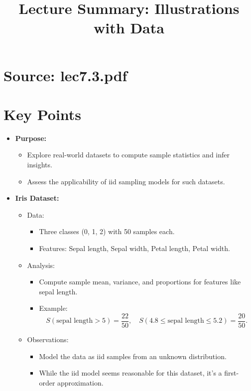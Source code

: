 \documentclass{article}
\title{Lecture Summary: Illustrations with Data}
\author{}
\date{}
\begin{document}
\maketitle

\section*{Source: lec7.3.pdf}

\section*{Key Points}

\begin{itemize}
  \item \textbf{Purpose:}
    \begin{itemize}
      \item Explore real-world datasets to compute sample statistics and infer insights.
      \item Assess the applicability of iid sampling models for such datasets.
    \end{itemize}

  \item \textbf{Iris Dataset:}
    \begin{itemize}
      \item Data:
        \begin{itemize}
          \item Three classes (0, 1, 2) with 50 samples each.
          \item Features: Sepal length, Sepal width, Petal length, Petal width.
        \end{itemize}
      \item Analysis:
        \begin{itemize}
          \item Compute sample mean, variance, and proportions for features like sepal length.
          \item Example:
            \[
              S(\text{sepal length} > 5) = \frac{22}{50}, \quad S(4.8 \leq \text{sepal length} \leq 5.2) = \frac{20}{50}.
            \]
        \end{itemize}
      \item Observations:
        \begin{itemize}
          \item Model the data as iid samples from an unknown distribution.
          \item While the iid model seems reasonable for this dataset, it's a first-order approximation.
        \end{itemize}
    \end{itemize}


\end{itemize}
\end{document}
